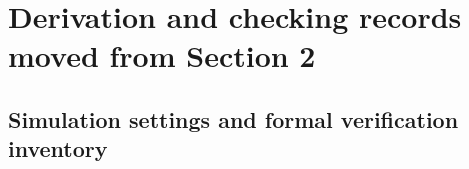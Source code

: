 
\section{Derivation and checking records moved from Section 2}\label{esm:from-main-methods}

\subsection{Simulation settings and formal verification inventory}\label{esm:methods-checks}

